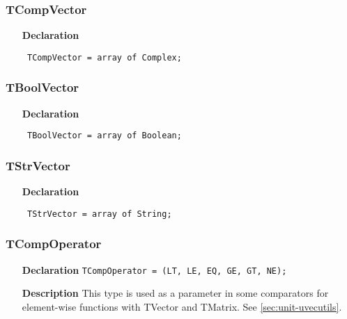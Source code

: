 \documentclass[12pt,a4paper,oneside]{report}
\newcommand{\lmatha}[1]{   %
	\marginpar{\vspace{#1} 
		\begin{flushright}
			LMath 0.5
	\end{flushright} }
}
\newcommand{\declarationitem}[1]{\textbf{#1}}
\newcommand{\descriptiontitle}[1]{\textbf{#1}}
\newcommand{\code}[1]{\texttt{#1}}
\begin{document}
\subsubsection{TCompVector}
\label{utypes-TCompVector}
\begin{itemize}\item[\declarationitem{Declaration}\hfill]
	\begin{flushleft}
		\code{
			TCompVector = array of Complex;}
		
	\end{flushleft}
	
\end{itemize}
\subsubsection{TBoolVector}
\label{utypes-TBoolVector}
\begin{itemize}\item[\declarationitem{Declaration}\hfill]
	\begin{flushleft}
		\code{
			TBoolVector = array of Boolean;}
		
	\end{flushleft}
	
\end{itemize}
\subsubsection{TStrVector}
\label{utypes-TStrVector}
\begin{itemize}\item[\declarationitem{Declaration}\hfill]
	\begin{flushleft}
		\code{
			TStrVector  = array of String;}
		
	\end{flushleft}
\end{itemize}
\subsubsection{TCompOperator}
\label{utypes-TCompOperator}
\lmatha{-20pt}
\begin{itemize}
	\item[\declarationitem{Declaration}\hfill]
	\code{TCompOperator = (LT, LE, EQ, GE, GT, NE);}
	\item[\descriptiontitle{Description}] This type is used as a parameter in some comparators for element-wise functions with TVector and TMatrix. See \ref{sec:unit-uvecutils}.
\end{itemize}
\end{document}
